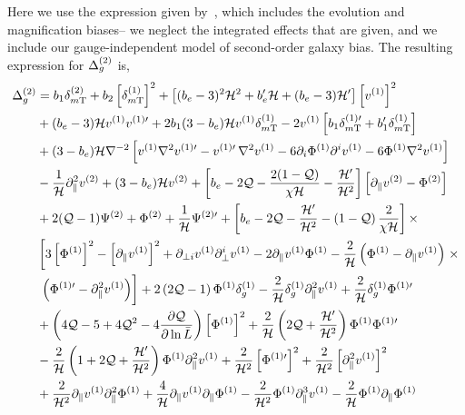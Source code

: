 Here we use the expression given by~\cite{Bertacca:2014hwa}, which includes the evolution and magnification biases-- we neglect the integrated effects that are given, and we include our gauge-independent model of second-order galaxy bias. The resulting expression for $\Delta_g^{(2)}$ is, 
\begin{align} 
\Delta_{g}^{(2)} &= b_1 \delta_{m{\mathrm{T}}}^\tw + b_2 \left[\delta_{m{\mathrm{T}}}^\on \right]^2 + \left[(b_e-3)^2 \cH^2 + b_e' \cH +(b_e-3) \cH' \right] \left[v^\on \right]^2 \nonumber \\
& + (b_e - 3)\cH v^\on v^{\on \prime} + 2b_1 (3 - b_e) \cH v^\on \delta_{m\mathrm{T}}^{(1)} - 2v^\on \left[ b_1 \delta_{m\mathrm{T}}^{\on \prime} + b_1' \delta_{m\mathrm{T}}^\on \right] \nonumber \\
&+ (3-b_{e})\cH \nabla^{-2} \left[v^\on \nabla^2 v^{\on \prime} - v^{\on \prime} \, \nabla^2 v^\on  - 6 \partial_{i}\Phi^\on \partial^{i}v^\on - 6 \Phi^\on \nabla^2 v^\on \right] \nonumber \\
&- \frac{1}{\cH} \partial_\parallel^2 v^\tw + (3-b_e) \cH v^\tw + \left[b_{e} - 2\mathcal{Q} -\frac{2(1-\mathcal{Q})}{\chi\mathcal{H}}- \frac{\mathcal{H}'}{\mathcal{H}^{2}} \right] \left[\partial_\parallel v^\tw - \Phi^\tw \right] \nonumber \\
& + 2(\Q - 1) \Psi^\tw + \Phi^\tw + \frac{1}{\cH} \Psi^{\tw\prime} + \left[ b_e-2 \Q - \frac{\cH'}{\cH^2} - \left(1 - \Q\right) \frac{2}{\chi \cH} \right] \times \nonumber \\
& \left[ 3 \left[{\Phi}^{(1)}\right]^2 - \left[ \p_\| v^\on \right]^2 + \p_{\perp i} v^\on \p^i_\perp v^\on - 2 \p_\| v^\on \Phi^\on - \frac{2}{\cH} \left( \Phi^\on - \p_\| v^\on \right) \right. \times \nonumber \\
& \left. \vphantom{\frac{1}{\cH}} \left( \Phi^{(1)\prime} - \p_\|^2 v^\on  \right)\right] +2 \left(2 \Q-1 \right) \Phi^\on \delta_g^\on - \frac{2}{\cH} \delta_g^\on \p_\|^2 v^\on +\frac{2}{\cH}\delta_g^\on \Phi^{\on \prime} \nonumber \\
& + \left( 4 \Q -5 + 4 \Q^2 - 4 \frac{\p \Q}{\p \ln \bar L} \right) \left[ \Phi^\on \right]^2 + \frac{2}{\cH} \left( 2\Q + \frac{\cH'}{\cH^2} \right) \Phi^\on \Phi^{\on \prime} \nonumber \\
& - \frac{2}{\cH} \left( 1+ 2\Q  +\frac{\cH'}{\cH^2} \right) \Phi^\on \p_\|^2 v^\on + \frac{2}{\cH^2} \left[ \Phi^{\on \prime}  \right]^2 + \frac{2}{\cH^2}\left[\p_\|^2 v^\on  \right]^2  \nonumber \\
& + \frac{2}{\cH^2} \p_\| v^{(1)}  \p_\|^2 \Phi^\on +\frac{4}{\cH}\p_\| v^\on\p_\| \Phi^\on - \frac{2}{\cH^2} \Phi^\on \p_\|^3 v^\on - \frac{2}{\cH} \Phi^\on \p_\| \Phi^\on \nonumber \\

\end{align}

